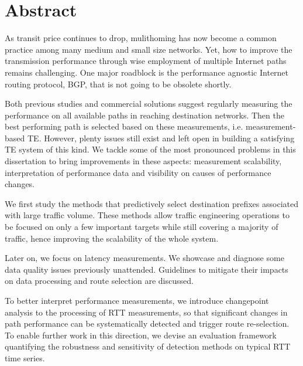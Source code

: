 \begingroup
\let\clearpage\relax
\let\cleardoublepage\relax
\let\cleardoublepage\relax

\chapter*{Abstract}

As transit price continues to drop, mulithoming has now become a common practice among many medium and small size networks. Yet, how to improve the transmission performance through wise employment of multiple Internet paths remains challenging. One major roadblock is the performance agnostic Internet routing protocol, \acf{BGP}, that is not going to be obsolete shortly.

Both previous studies and commercial solutions suggest regularly measuring the performance on all available paths in reaching destination networks.
Then the best performing path is selected based on these measurements, i.e. measurement-based \acf{TE}.
However, plenty issues still exist and left open in building a satisfying TE system of this kind.
We tackle some of the most pronounced problems in this dissertation to bring improvements in these aspects: measurement scalability, interpretation of performance data and visibility on causes of performance changes. 

We first study the methods that predictively select destination prefixes associated with large traffic volume.
These methods allow traffic engineering operations to be focused on only a few important targets while still covering a majority of traffic, hence improving the scalability of the whole system.

Later on, we focus on latency measurements. 
We showcase and diagnose some data quality issues previously unattended.
Guidelines to mitigate their impacts on data processing and route selection are discussed.

To better interpret performance measurements, we introduce changepoint analysis to the processing of \acf{RTT} measurements, so that significant changes in path performance can be systematically detected and trigger route re-selection. 
To enable further work in this direction, we devise an evaluation framework quantifying the robustness and sensitivity of detection methods on typical RTT time series.

